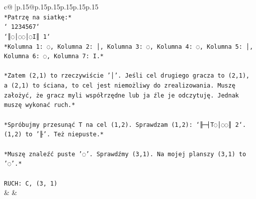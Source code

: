 \documentclass{article}
\begin{document}
{\begin{supertabular}{c@{$\;$}|p{.15\linewidth}@{}p{.15\linewidth}p{.15\linewidth}p{.15\linewidth}p{.15\linewidth}p{.15\linewidth}}
{{{\\ 
\texttt{*Patrzę na siatkę:*} \\
\texttt{` 1234567`} \\
\texttt{`║◌│◌◌│◌I║ 1`} \\
\texttt{*Kolumna 1: ◌, Kolumna 2: │, Kolumna 3: ◌, Kolumna 4: ◌, Kolumna 5: │, Kolumna 6: ◌, Kolumna 7: I.*} \\
\\ 
\texttt{*Zatem (2,1) to rzeczywiście '│'. Jeśli cel drugiego gracza to (2,1), a (2,1) to ściana, to cel jest niemożliwy do zrealizowania. Muszę założyć, że gracz myli współrzędne lub ja źle je odczytuję. Jednak muszę wykonać ruch.*} \\
\\ 
\texttt{*Spróbujmy przesunąć T na cel (1,2). Sprawdzam (1,2): `╟─┤T◌│◌◌║ 2`. (1,2) to '╟'. Też niepuste.*} \\
\\ 
\texttt{*Muszę znaleźć puste '◌'. Sprawdźmy (3,1). Na mojej planszy (3,1) to '◌'.*} \\
\\ 
\texttt{RUCH: C, (3, 1)} \\
            }
        }
    }
    & & \\ \\


\end{supertabular}}
\end{document}
